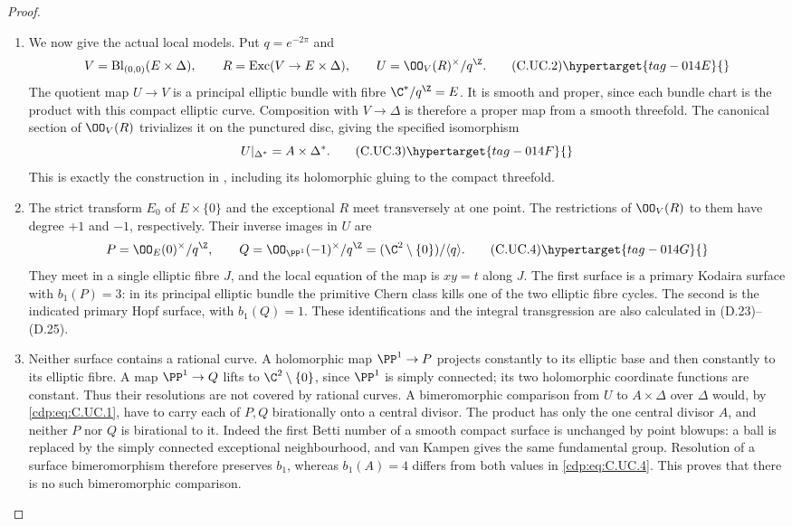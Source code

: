\begin{proof}
\begin{enumerate}[label={$\langle1\rangle$\arabic*.},leftmargin=*]
\item We now give the actual local models. Put
$q=e^{-2\pi}$ and
\[
 V=\operatorname{Bl}_{(0,0)}(E\times\Delta),
 \qquad R=\operatorname{Exc}(V\to E\times\Delta),
 \qquad U=\OO_V(R)^\times/q^{\Z}.
\tag{C.UC.2}\hypertarget{tag-014E}{}\label{cdp:eq:C.UC.2}
\]
The quotient map $U\to V$ is a principal
elliptic bundle with fibre $\C^*/q^{\Z}=E$.
It is smooth and proper, since each bundle
chart is the product with this compact
elliptic curve. Composition with $V\to\Delta$
is therefore a proper map from a smooth
threefold. The canonical section of
$\OO_V(R)$ trivializes it on the punctured
disc, giving the specified isomorphism
\[
                         U|_{\Delta^*}=A\times\Delta^*.
\tag{C.UC.3}\hypertarget{tag-014F}{}\label{cdp:eq:C.UC.3}
\]
This is exactly the construction in ,
including its holomorphic gluing to the
compact threefold.

\item The strict transform $E_0$ of $E\times\{0\}$
and the exceptional $R$ meet transversely at
one point. The restrictions of $\OO_V(R)$
to them have degree $+1$ and $-1$,
respectively. Their inverse images in $U$
are
\[
 P=\OO_E(0)^\times/q^{\Z},\qquad
 Q=\OO_{\PP^1}(-1)^\times/q^{\Z}
       =(\C^2\setminus\{0\})/\langle q\rangle.
\tag{C.UC.4}\hypertarget{tag-014G}{}\label{cdp:eq:C.UC.4}
\]
They meet in a single elliptic fibre $J$,
and the local equation of the map is
$xy=t$ along $J$. The first surface is a
primary Kodaira surface with $b_1(P)=3$:
in its principal elliptic bundle the primitive
Chern class kills one of the two elliptic
fibre cycles. The second is the indicated
primary Hopf surface, with $b_1(Q)=1$.
These identifications and the integral
transgression are also calculated in
(D.23)--(D.25).

\item Neither surface contains a rational curve.
A holomorphic map $\PP^1\to P$ projects
constantly to its elliptic base and then
constantly to its elliptic fibre. A map
$\PP^1\to Q$ lifts to $\C^2\setminus\{0\}$,
since $\PP^1$ is simply connected; its two
holomorphic coordinate functions are constant.
Thus their resolutions are not covered by
rational curves. A bimeromorphic comparison
from $U$ to $A\times\Delta$ over $\Delta$
would, by \eqref{cdp:eq:C.UC.1}, have to carry each of
$P,Q$ birationally onto a central divisor.
The product has only the one central
divisor $A$, and neither $P$ nor $Q$ is
birational to it. Indeed the first Betti
number of a smooth compact surface is
unchanged by point blowups: a ball is
replaced by the simply connected exceptional
neighbourhood, and van Kampen gives the
same fundamental group. Resolution of a
surface bimeromorphism therefore preserves
$b_1$, whereas $b_1(A)=4$ differs from
both values in \eqref{cdp:eq:C.UC.4}. This proves that
there is no such bimeromorphic comparison.


\end{enumerate}
\end{proof}
